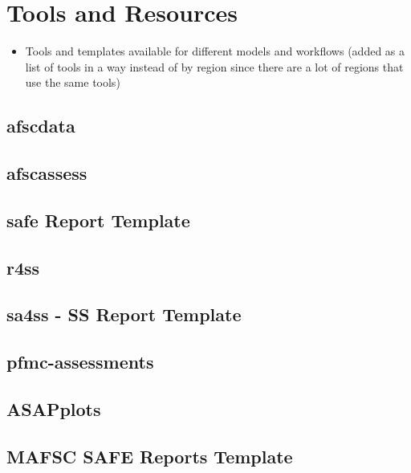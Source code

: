 \documentclass[
  letterpaper,
  oneside,
  open=any]{scrbook}
\providecommand{\tightlist}{%
  \setlength{\itemsep}{0pt}\setlength{\parskip}{0pt}}\usepackage{longtable,booktabs,array}
\begin{document}

\chapter{Tools and Resources}\label{sec-tools}

\begin{itemize}
\tightlist
\item
  Tools and templates available for different models and workflows
  (added as a list of tools in a way instead of by region since there
  are a lot of regions that use the same tools)
\end{itemize}

\section{afscdata}\label{sec-afscdata}

\section{afscassess}\label{sec-afscassess}

\section{safe Report Template}\label{sec-safe}

\section{r4ss}\label{sec-r4ss}

\section{sa4ss - SS Report Template}\label{sec-sa4ss}

\section{pfmc-assessments}\label{sec-pfmcassess}

\section{ASAPplots}\label{sec-asapplots}

\section{MAFSC SAFE Reports Template}\label{sec-mafscsafe}
\end{document}
